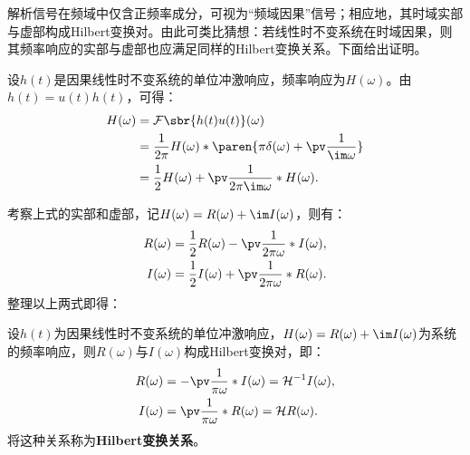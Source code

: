 解析信号在频域中仅含正频率成分，可视为“频域因果”信号；相应地，其时域实部与虚部构成Hilbert变换对。由此可类比猜想：若线性时不变系统在时域因果，则其频率响应的实部与虚部也应满足同样的Hilbert变换关系。下面给出证明。

设$h(t)$是因果线性时不变系统的单位冲激响应，频率响应为$H(\omega)$。由$h(t)=u(t)h(t)$，可得：
\begin{align}
    H(\omega)&=\mathcal{F}\sbr{h(t)u(t)}(\omega)\nonumber\\
    &=\frac{1}{2\pi}H(\omega)*\paren{\pi\delta(\omega)+\pv\frac{1}{\im\omega}}\nonumber\\
    &=\frac{1}{2}H(\omega)+\pv\frac{1}{2\pi\im\omega}*H(\omega).
\end{align}

考察上式的实部和虚部，记$H(\omega)=R(\omega)+\im I(\omega)$，则有：
\begin{align}
    R(\omega)&=\frac{1}{2}R(\omega)-\pv\frac{1}{2\pi\omega}*I(\omega),\\
    I(\omega)&=\frac{1}{2}I(\omega)+\pv\frac{1}{2\pi\omega}*R(\omega).
\end{align}
整理以上两式即得：
\begin{theorem}[Hilbert变换关系]
    设$h(t)$为因果线性时不变系统的单位冲激响应，$H(\omega)=R(\omega)+\im I(\omega)$为系统的频率响应，则$R(\omega)$与$I(\omega)$构成Hilbert变换对，即：
    \begin{align}
        R(\omega)&=-\pv\frac{1}{\pi\omega}*I(\omega)=\mathcal{H}^{-1}I(\omega),\\
        I(\omega)&=\pv\frac{1}{\pi\omega}*R(\omega)=\mathcal{H}R(\omega).
    \end{align}
    将这种关系称为\textbf{Hilbert变换关系}。
\end{theorem}

